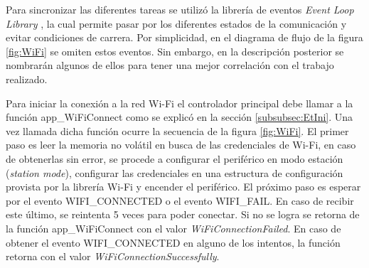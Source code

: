 Para sincronizar las diferentes tareas se utilizó la librería de eventos \textit{Event Loop Library} \citep{EVENT}, la cual permite pasar por los diferentes estados de la comunicación y evitar condiciones de carrera. Por simplicidad, en el diagrama de flujo de la figura \ref{fig:WiFi} se omiten estos eventos. Sin embargo, en la descripción posterior se nombrarán algunos de ellos para tener una mejor correlación con el trabajo realizado.

Para iniciar la conexión a la red Wi-Fi el controlador principal debe llamar a la función app\_WiFiConnect como se explicó en la sección \ref{subsubsec:EtIni}. Una vez llamada dicha función ocurre la secuencia de la figura \ref{fig:WiFi}. El primer paso es leer la memoria no volátil en busca de las credenciales de Wi-Fi, en caso de obtenerlas sin error, se procede a configurar el periférico en modo estación (\textit{station mode}), configurar las credenciales en una estructura de configuración provista por la librería Wi-Fi y encender el periférico. El próximo paso es esperar por el evento WIFI\_CONNECTED o el evento WIFI\_FAIL. En caso de recibir este último, se reintenta 5 veces para poder conectar. Si no se logra se retorna de la función app\_WiFiConnect con el valor \textit{WiFiConnectionFailed}. En caso de obtener el evento  WIFI\_CONNECTED en alguno de los intentos, la función retorna con el valor \textit{WiFiConnectionSuccessfully}.

\pagebreak

